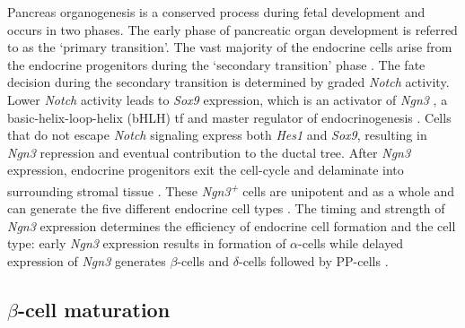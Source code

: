 Pancreas organogenesis is a conserved process during fetal development and occurs in two phases. The early phase of pancreatic organ development is referred to as the `primary transition'. The vast majority of the endocrine cells arise from the endocrine progenitors during the `secondary transition' phase \textbf{\cite{pan_pancreas_2011}}. The fate decision during the secondary transition is determined by graded \textit{Notch} activity. Lower \textit{Notch} activity leads to \textit{Sox9} expression, which is an activator of \textit{Ngn3} \textbf{\cite{shih_pancreas_2013}}, a basic-helix-loop-helix (bHLH) \gls{tf} and master regulator of endocrinogenesis \textbf{\cite{gu_direct_2002}}. Cells that do not escape \textit{Notch} signaling express both \textit{Hes1} and \textit{Sox9}, resulting in \textit{Ngn3} repression and eventual contribution to the ductal tree. After \textit{Ngn3} expression, endocrine progenitors exit the cell-cycle and delaminate into surrounding stromal tissue \textbf{\cite{shih_pancreas_2013, gouzi_neurogenin3_2011, miyatsuka_neurogenin3_2011}}. These \textit{Ngn3\textsuperscript{+}} cells are unipotent and as a whole and can generate the five different endocrine cell types \textbf{\cite{shih_pancreas_2013,gu_direct_2002,miyatsuka_neurogenin3_2011}}. The timing and strength of \textit{Ngn3} expression determines the efficiency of endocrine cell formation and the cell type: early \textit{Ngn3} expression results in formation of $\alpha$-cells while delayed expression of \textit{Ngn3} generates $\beta$-cells and $\delta$-cells followed by PP-cells \textbf{\cite{johansson_temporal_2007}}.



\subsection{$\beta$-cell maturation} %
\label{sec:betamat}


